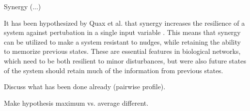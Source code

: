 \documentclass[../main.tex]{subfiles}
\begin{document}

Synergy (...)

It has been hypothesized by Quax et al. that synergy increases the resilience of a system against pertubation in a single input variable \cite{quax2017quantifying}. 
This means that synergy can be utilized to make a system resistant to nudges, while retaining the ability to memorize previous states. 
These are essential features in biological networks, which need to be both resilient to minor disturbances, but were also future states of the system should retain much of the information from previous states.

Discuss what has been done already (pairwise profile).

Make hypothesis maximum vs. average different.


\biblio
\end{document}
